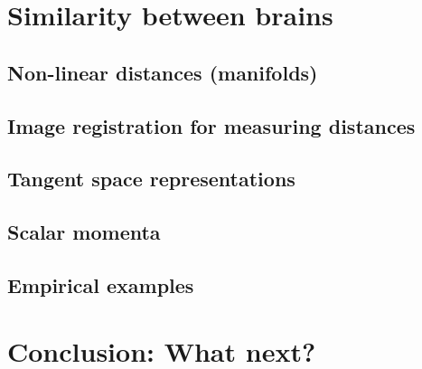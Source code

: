 \documentclass{beamer}
\begin{document}
\section{Similarity between brains}
    \subsection{Non-linear distances (manifolds)}                 
    \subsection{Image registration for measuring distances}       
    \subsection{Tangent space representations}                    
    \subsection{Scalar momenta}                                   
    \subsection{Empirical examples}                               

\section{Conclusion: What next?}
                                                                  
\end{document}
